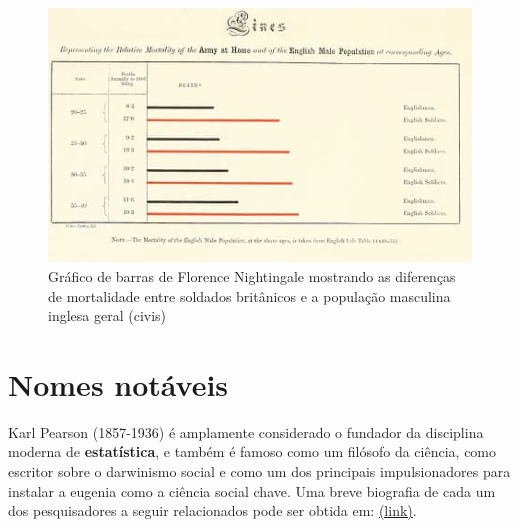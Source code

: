 \documentclass[
]{book}
\theoremstyle{definition}
\theoremstyle{definition}
\theoremstyle{definition}
\theoremstyle{definition}
\theoremstyle{remark}
\begin{document}
\begin{figure}

{\centering \includegraphics[width=0.5\linewidth]{images/florence-barr} 

}

\caption{Gráfico de barras de Florence Nightingale mostrando as diferenças de mortalidade entre soldados britânicos e a população masculina inglesa geral (civis)}\label{fig:unnamed-chunk-14}
\end{figure}

\hypertarget{nomes-notuxe1veis}{%
\section{Nomes notáveis}\label{nomes-notuxe1veis}}

Karl Pearson (1857-1936) é amplamente considerado o fundador da disciplina moderna de \textbf{estatística}, e também é famoso como um filósofo da ciência, como escritor sobre o darwinismo social e como um dos principais impulsionadores para instalar a eugenia como a ciência social chave. Uma breve biografia de cada um dos pesquisadores a seguir relacionados pode ser obtida em: \href{http://www-history.mcs.st-andrews.ac.uk/BiogIndex.html}{(link)}.
\end{document}
